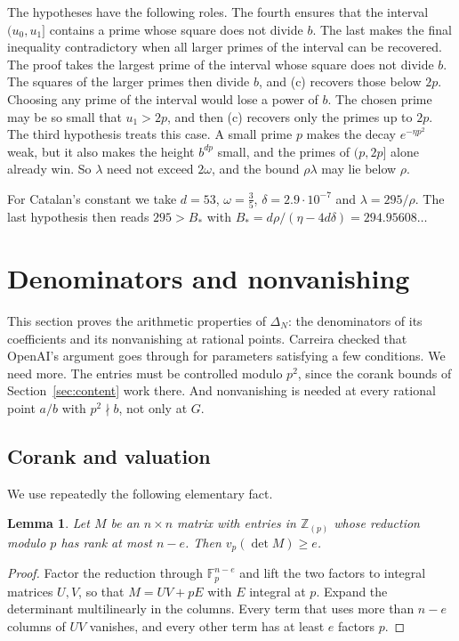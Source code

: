 \documentclass[11pt]{amsart}
\newcommand{\Bstar}{294.95608}
\newtheorem{lemma}[theorem]{Lemma}
\theoremstyle{definition}
\theoremstyle{remark}
\numberwithin{equation}{section}
\newcommand{\Z}{\mathbb Z}
\newcommand{\F}{\mathbb F}
\begin{document}
The hypotheses have the following roles. The fourth ensures that the interval $(u_0,u_1]$ contains a prime
whose square does not divide $b$. The last makes the final inequality contradictory when all larger primes
of the interval can be recovered. The proof takes the largest prime of the interval whose square does not
divide $b$. The squares of the larger primes then divide $b$, and (c) recovers those below $2p$. Choosing
any prime of the interval would lose a power of $b$. The chosen prime may be so small that $u_1>2p$, and then
(c) recovers only the primes up to $2p$. The third hypothesis treats this case. A small prime $p$ makes the
decay $e^{-\eta p^2}$ weak, but it also makes the height $b^{dp}$ small, and the primes of $(p,2p]$ alone
already win. So $\lambda$ need not exceed $2\omega$, and the bound $\rho\lambda$ may lie below $\rho$.

For Catalan's constant we take $d=53$, $\omega=\frac35$, $\delta=2.9\cdot10^{-7}$ and $\lambda=295/\rho$.
The last hypothesis then reads $295>B_*$ with $B_*=d\rho/(\eta-4d\delta)=\Bstar\ldots$

\section{Denominators and nonvanishing}\label{sec:setup}

This section proves the arithmetic properties of $\Delta_N$: the denominators of its coefficients and its
nonvanishing at rational points. Carreira \cite{Carreira2026} checked that OpenAI's argument goes through
for parameters satisfying a few conditions. We need more. The entries must be controlled modulo $p^2$,
since the corank bounds of Section~\ref{sec:content} work there. And nonvanishing is needed at every
rational point $a/b$ with $p^2\nmid b$, not only at $G$.

\subsection{Corank and valuation}
We use repeatedly the following elementary fact.

\begin{lemma}\label{lem:rank-valuation}
Let $M$ be an $n\times n$ matrix with entries in $\Z_{(p)}$ whose reduction modulo $p$ has rank at most
$n-e$. Then $v_p(\det M)\ge e$.
\end{lemma}

\begin{proof}
Factor the reduction through $\F_p^{n-e}$ and lift the two factors to integral matrices $U,V$, so that
$M=UV+pE$ with $E$ integral at $p$. Expand the determinant multilinearly in the columns. Every term that
uses more than $n-e$ columns of $UV$ vanishes, and every other term has at least $e$ factors $p$.
\end{proof}
\end{document}
